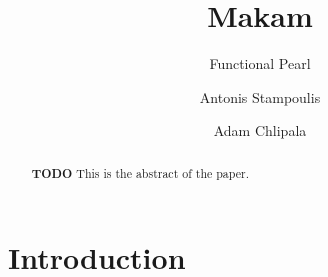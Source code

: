 \documentclass[format=acmlarge,review,anonymous]{acmart}\settopmatter{printfolios=true}
\begin{document}
\title{Makam}
\subtitle{Functional Pearl}

\author{Antonis Stampoulis}

\author{Adam Chlipala}

\newcommand\TODO[0]{\textbf{TODO}}
\newcommand\lamprolog[0]{$\lambda$Prolog\xspace}
\newcommand\fomega[0]{F$\omega$\xspace}
\renewenvironment{verbatim}{\begin{quote}\begin{alltt}}{\end{alltt}\end{quote}}
\newenvironment{codequote}{\begin{quote}\begin{alltt}}{\end{alltt}\end{quote}}
\newcommand\hide[1]{}
\newcommand\tightlist[0]{}

\begin{abstract}
\TODO{} This is the abstract of the paper.
\end{abstract}



\maketitle

\section{Introduction}
\end{document}
